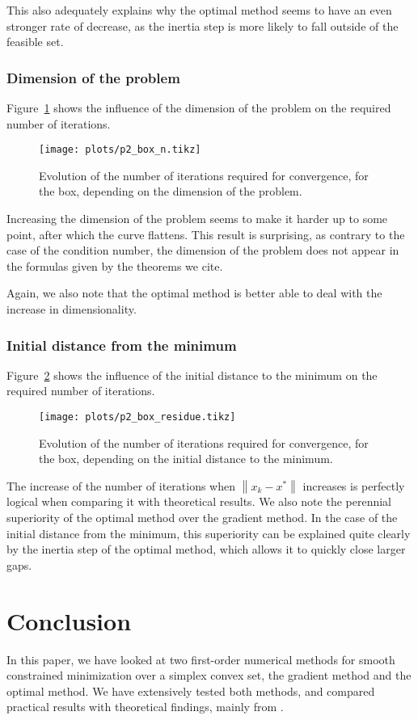 \documentclass[final]{aomart}
\newcommand{\xk}{x_k}
\newcommand{\xopt}{x^*}
\newtheorem[{}\it]{thm}{Theorem}[section]
\theoremstyle{definition}
\newtheorem*[{}\it]{notation}{Notation}
\numberwithin{equation}{section}
\newcommand{\enVert}[1]{\left\lVert#1\right\rVert}
\let\norm=\enVert
\begin{document}
This also adequately explains why the optimal method seems to have an even stronger rate of decrease, as the inertia step is more likely to fall outside of the feasible set.

\subsubsection{Dimension of the problem}
Figure~\ref{fig:p2_box_n} shows the influence of the dimension of the problem on the required number of iterations.
\begin{figure}[!hbtp]
	\centering
	\texttt{[image: plots/p2\_box\_n.tikz]}
	\caption{Evolution of the number of iterations required for convergence, for the box, depending on the dimension of the problem.}
	\label{fig:p2_box_n}
\end{figure}

Increasing the dimension of the problem seems to make it harder up to some point, after which the curve flattens.
This result is surprising, as contrary to the case of the condition number, the dimension of the problem does not appear in the formulas given by the theorems we cite.

Again, we also note that the optimal method is better able to deal with the increase in dimensionality.

\subsubsection{Initial distance from the minimum}
Figure~\ref{fig:p2_box_residue} shows the influence of the initial distance to the minimum on the required number of iterations.
\begin{figure}[!hbtp]
	\centering
	\texttt{[image: plots/p2\_box\_residue.tikz]}
	\caption{Evolution of the number of iterations required for convergence, for the box, depending on the initial distance to the minimum.}
	\label{fig:p2_box_residue}
\end{figure}

The increase of the number of iterations when \(\norm{\xk - \xopt}\) increases is perfectly logical when comparing it with theoretical results.
We also note the perennial superiority of the optimal method over the gradient method.
In the case of the initial distance from the minimum, this superiority can be explained quite clearly by the inertia step of the optimal method, which allows it to quickly close larger gaps.


\section{Conclusion}
\label{sec:conclusion}
In this paper, we have looked at two first-order numerical methods for smooth constrained minimization over a simplex convex set, the gradient method and the optimal method.
We have extensively tested both methods, and compared practical results with theoretical findings, mainly from \cite{Nesterov2018}.
\end{document}
